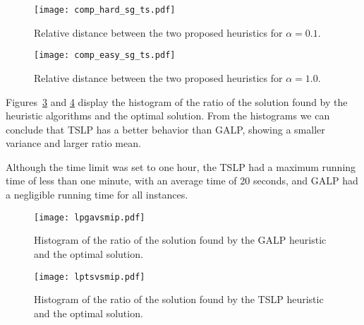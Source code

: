 \begin{figure}
\centering
\texttt{[image: comp\_hard\_sg\_ts.pdf]}
\caption{Relative distance between the two proposed heuristics for $\alpha=0.1$.}
\label{fig:comp_2}
\end{figure}

\begin{figure}
\centering
\texttt{[image: comp\_easy\_sg\_ts.pdf]}
\caption{Relative distance between the two proposed heuristics for $\alpha=1.0$.}
\label{fig:comp_3}
\end{figure}

Figures~\ref{fig:lpgavsmip} and \ref{fig:lptsvsmip} display the histogram of
the ratio of the solution found by the heuristic algorithms and the optimal solution.
From the histograms we can conclude that TSLP has a better behavior than GALP,
showing a smaller variance and larger ratio mean.

Although the time limit was set to one hour, the TSLP had a maximum running time of less than one minute, with an average time of 20 seconds, and GALP had a negligible running time for all instances.

\begin{figure}
\centering
\texttt{[image: lpgavsmip.pdf]}
\caption{Histogram of the ratio of the solution found by the GALP heuristic and the optimal solution.}
\label{fig:lpgavsmip}
\end{figure}

\begin{figure}
\centering
\texttt{[image: lptsvsmip.pdf]}
\caption{Histogram of the ratio of the solution found by the TSLP heuristic and the optimal solution.}
\label{fig:lptsvsmip}
\end{figure}


